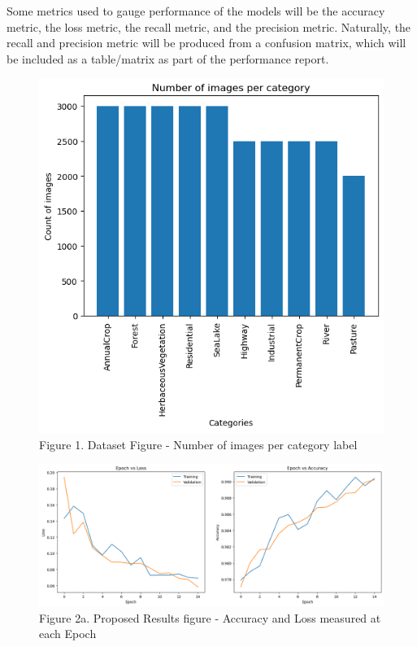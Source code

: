 \documentclass[acmtog]{acmart}
\begin{document}
	Some metrics used to gauge performance of the models will be the accuracy metric, the loss metric, the recall metric, and the precision metric. Naturally, the recall and precision metric will be produced from a confusion matrix, which will be included as a table/matrix as part of the performance report.


	\begin{figure}[h]
		\centering
		\includegraphics[scale=0.7]{src/images/Fig1.png}\\
		Figure 1. Dataset Figure - Number of images per category label
		
		\vspace{2cm}
		
		\centering
		\includegraphics[scale=0.5]{src/images/Fig3.png}\\
		Figure 2a. Proposed Results figure - Accuracy and Loss measured at each Epoch
	\end{figure}
	
\end{document}
